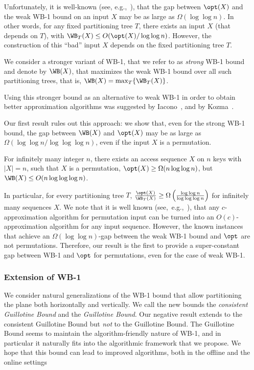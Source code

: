 Unfortunately, it is well-known (see, e.g.,~\cite{tango,multisplay,in_pursuit}), that the gap between $\opt(X)$
and the weak WB-1 bound on an input $X$ may be as large as  $\Omega(\log\log n)$. 
In other words, for any fixed partitioning tree $T$, there exists an input $X$ (that depends on $T$),  with $\WB_{T}(X)\leq O(\opt(X)/\log\log n)$.
However, the construction of this ``bad'' input $X$  depends on the fixed partitioning tree $T$. 


We consider a stronger variant of WB-1, that we refer to as \emph{strong} WB-1 bound and denote by $\WB(X)$, that maximizes the weak WB-1 bound over all such partitioning trees, that is, $\WB(X)=\max_{T}\{\WB_{T}(X)\}$. 


Using this stronger bound as an alternative to weak WB-1 in order to obtain better approximation algorithms was suggested by Iacono~\cite{in_pursuit}, and by Kozma~\cite{Kozma16_thesis}.



 
Our first result rules out this approach: we show that, even for the strong WB-1 bound, the gap between $\WB(X)$ and $\opt(X)$ may be as large as $\Omega(\log\log n/\log\log\log n)$, even if the input $X$ is a permutation. 


%
%
\begin{theorem}
	\label{thm:intro_WB}
	For infinitely many integer $n$, there exists
	an access sequence $X$ on $n$ keys with $|X|=n$, such that $X$ is a permutation, $\opt(X)\geq \Omega(n\log\log n)$, but $\WB(X)\leq O(n\log\log\log n)$.
\end{theorem}

In particular, for every partitioning tree $T$, $\frac{\opt(X)}{\WB_{T}(X)}\geq \Omega\left(\frac{\log\log n}{\log\log\log n}\right )$ for infinitely many sequences $X$.
We note that it is well known  (see,~e.g.,~\cite{FOCS15}), that any $c$-approximation algorithm for permutation input can be turned into an $O(c)$-approximation algorithm for any input sequence. However, the known instances that achieve an $\Omega(\log\log n)$-gap between the weak WB-1 bound and $\opt$ are not permutations. Therefore, our result is the first to provide a super-constant gap between WB-1 and $\opt$ for permutations, even for the case of weak WB-1.



\subsubsection{Extension of WB-1}
\label{sec:extension-intro} 
We consider natural generalizations of the WB-1 bound that allow partitioning the plane both horizontally and vertically. We call the new bounds the \emph{consistent Guillotine Bound} and the \emph{Guillotine Bound}. 
Our negative result extends to the consistent Guillotine Bound but \emph{not} to the Guillotine Bound. The Guillotine Bound seems to maintain the  algorithm-friendly nature of WB-1, and in particular it naturally fits into the algorithmic framework that we propose. We hope that this bound can lead to improved algorithms, both in the offline and the online settings




